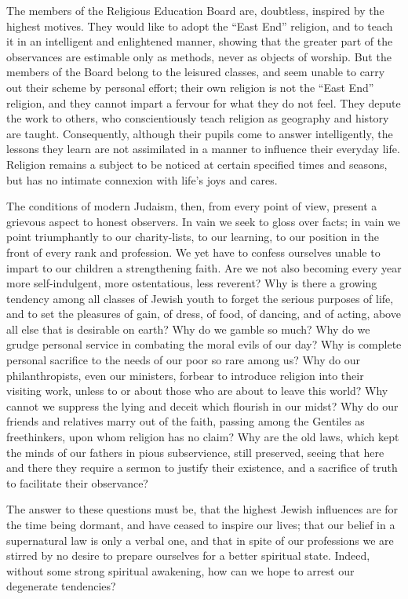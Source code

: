 The members of the Religious Education Board are, 
doubtless, inspired by the highest motives. They would 
like to adopt the ``East End'' religion, and to teach it 
in an intelligent and enlightened manner, showing that 
the greater part of the observances are estimable only as 
methods, never as objects of worship. But the members 
of the Board belong to the leisured classes, and seem 
unable to carry out their scheme by personal effort; their 
own religion is not the ``East End'' religion, and they 
cannot impart a fervour for what they do not feel. They 
depute the work to others, who conscientiously teach religion as geography and history are taught. Consequently, 
although their pupils come to answer intelligently, the 
lessons they learn are not assimilated in a manner to 
influence their everyday life. Religion remains a subject 
to be noticed at certain specified times and seasons, but 
has no intimate connexion with life's joys and cares. 

The conditions of modern Judaism, then, from every point 
of view, present a grievous aspect to honest observers. In 
vain we seek to gloss over facts; in vain we point triumphantly to our charity-lists, to our learning, to our position 
in the front of every rank and profession. We yet have 
to confess ourselves unable to impart to our children a 
strengthening faith. Are we not also becoming every 
year more self-indulgent, more ostentatious, less reverent? 
Why is there a growing tendency among all classes of 
Jewish youth to forget the serious purposes of life, and 
to set the pleasures of gain, of dress, of food, of dancing, 
and of acting, above all else that is desirable on earth? 
Why do we gamble so much? Why do we grudge personal 
service in combating the moral evils of our day? Why is 
complete personal sacrifice to the needs of our poor so rare 
among us? Why do our philanthropists, even our ministers, 
forbear to introduce religion into their visiting work, 
unless to or about those who are about to leave this world? 
Why cannot we suppress the lying and deceit which flourish 
in our midst? Why do our friends and relatives marry out 
of the faith, passing among the Gentiles as freethinkers, 
upon whom religion has no claim? Why are the old laws, 
which kept the minds of our fathers in pious subservience, 
still preserved, seeing that here and there they require a 
sermon to justify their existence, and a sacrifice of truth 
to facilitate their observance? 

The answer to these questions must be, that the highest 
Jewish influences are for the time being dormant, and have 
ceased to inspire our lives; that our belief in a supernatural law is only a verbal one, and that in spite of our 
professions we are stirred by no desire to prepare ourselves 
for a better spiritual state. Indeed, without some strong 
spiritual awakening, how can we hope to arrest our 
degenerate tendencies? 

